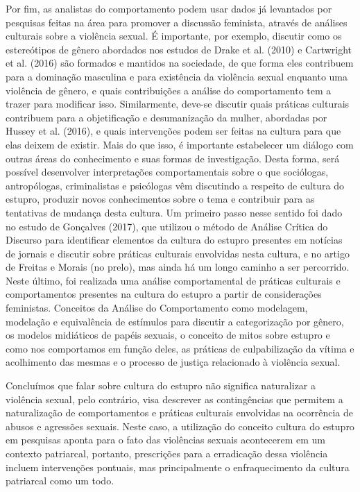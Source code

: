 Por fim, as analistas do comportamento podem usar dados já levantados por pesquisas feitas na área para promover a discussão feminista, através de análises culturais sobre a violência sexual. É importante, por exemplo, discutir como os estereótipos de gênero abordados nos estudos de Drake et al. (2010) e Cartwright et al. (2016) são formados e mantidos na sociedade, de que forma eles contribuem para a dominação masculina e para existência da violência sexual enquanto uma violência de gênero, e quais contribuições a análise do comportamento tem a trazer para modificar isso. Similarmente, deve-se discutir quais práticas culturais contribuem para a objetificação e desumanização da mulher, abordadas por Hussey et al. (2016), e quais intervenções podem ser feitas na cultura para que elas deixem de existir. Mais do que isso, é importante estabelecer um diálogo com outras áreas do conhecimento e suas formas de investigação. Desta forma, será possível desenvolver interpretações comportamentais sobre o que sociólogas, antropólogas, criminalistas e psicólogas vêm discutindo a respeito de cultura do estupro, produzir novos conhecimentos sobre o tema e contribuir para as tentativas de mudança desta cultura. Um primeiro passo nesse sentido foi dado no estudo de Gonçalves (2017), que utilizou o método de Análise Crítica do Discurso para identificar elementos da cultura do estupro presentes em notícias de jornais e discutir sobre práticas culturais envolvidas nesta cultura, e no artigo de Freitas e Morais (no prelo), mas ainda há um longo caminho a ser percorrido. Neste último, foi realizada uma análise comportamental de práticas culturais e comportamentos presentes na cultura do estupro a partir de considerações feministas. Conceitos da Análise do Comportamento como modelagem, modelação e equivalência de estímulos para discutir a categorização por gênero, os modelos midiáticos de papéis sexuais, o conceito de mitos sobre estupro e como nos comportamos em função deles, as práticas de culpabilização da vítima e acolhimento das mesmas e o processo de justiça relacionado à violência sexual.

Concluímos que falar sobre cultura do estupro não significa naturalizar a violência sexual, pelo contrário, visa descrever as contingências que permitem a naturalização de comportamentos e práticas culturais envolvidas na ocorrência de abusos e agressões sexuais. Neste caso, a utilização do conceito cultura do estupro em pesquisas aponta para o fato das violências sexuais acontecerem em um contexto patriarcal, portanto, prescrições para a erradicação dessa violência incluem intervenções pontuais, mas principalmente o enfraquecimento da cultura patriarcal como um todo.
\vfill
\pagebreak
